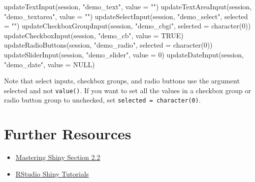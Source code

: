 \documentclass[
  oneside]{book}
\newenvironment{Shaded}{\begin{snugshade}}{\end{snugshade}}
\newcommand{\AttributeTok}[1]{\textcolor[rgb]{0.77,0.63,0.00}{#1}}
\newcommand{\ConstantTok}[1]{\textcolor[rgb]{0.00,0.00,0.00}{#1}}
\newcommand{\DecValTok}[1]{\textcolor[rgb]{0.00,0.00,0.81}{#1}}
\newcommand{\FunctionTok}[1]{\textcolor[rgb]{0.00,0.00,0.00}{#1}}
\newcommand{\NormalTok}[1]{#1}
\newcommand{\StringTok}[1]{\textcolor[rgb]{0.31,0.60,0.02}{#1}}
\providecommand{\tightlist}{%
  \setlength{\itemsep}{0pt}\setlength{\parskip}{0pt}}
\begin{document}
\begin{Shaded}
\begin{Highlighting}[]
\FunctionTok{updateTextInput}\NormalTok{(session, }\StringTok{"demo\_text"}\NormalTok{, }\AttributeTok{value =} \StringTok{""}\NormalTok{)}
\FunctionTok{updateTextAreaInput}\NormalTok{(session, }\StringTok{"demo\_textarea"}\NormalTok{, }\AttributeTok{value =} \StringTok{""}\NormalTok{)}
\FunctionTok{updateSelectInput}\NormalTok{(session, }\StringTok{"demo\_select"}\NormalTok{, }\AttributeTok{selected =} \StringTok{""}\NormalTok{)}
\FunctionTok{updateCheckboxGroupInput}\NormalTok{(session, }\StringTok{"demo\_cbgi"}\NormalTok{, }\AttributeTok{selected =} \FunctionTok{character}\NormalTok{(}\DecValTok{0}\NormalTok{))}
\FunctionTok{updateCheckboxInput}\NormalTok{(session, }\StringTok{"demo\_cb"}\NormalTok{, }\AttributeTok{value =} \ConstantTok{TRUE}\NormalTok{)}
\FunctionTok{updateRadioButtons}\NormalTok{(session, }\StringTok{"demo\_radio"}\NormalTok{, }\AttributeTok{selected =} \FunctionTok{character}\NormalTok{(}\DecValTok{0}\NormalTok{))}
\FunctionTok{updateSliderInput}\NormalTok{(session, }\StringTok{"demo\_slider"}\NormalTok{, }\AttributeTok{value =} \DecValTok{0}\NormalTok{)}
\FunctionTok{updateDateInput}\NormalTok{(session, }\StringTok{"demo\_date"}\NormalTok{, }\AttributeTok{value =} \ConstantTok{NULL}\NormalTok{)}
\end{Highlighting}
\end{Shaded}

\begin{warning}
Note that select inputs, checkbox groups, and radio buttons use the argument \AttributeTok{selected} and not \texttt{value}\texttt{()}. If you want to set all the values in a checkbox group or radio button group to unchecked, set \texttt{selected\ =\ character(0)}.

\end{warning}

\hypertarget{resources-inputs}{%
\section{Further Resources}\label{resources-inputs}}

\begin{itemize}
\tightlist
\item
  \href{https://mastering-shiny.org/basic-ui.html\#inputs}{Mastering Shiny Section 2.2}
\item
  \href{https://vimeo.com/rstudioinc/review/131218530/212d8a5a7a/\#t=10m41s}{RStudio Shiny Tutorials}
\end{itemize}
\end{document}
